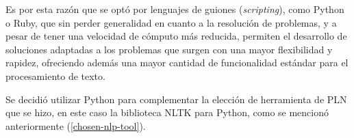 Es por esta razón que se optó por lenguajes de guiones (\textit{scripting}), como Python o Ruby, que sin perder generalidad en cuanto a la resolución de problemas, y a pesar de tener una velocidad de cómputo más reducida, permiten el desarrollo de soluciones adaptadas a los problemas que surgen con una mayor flexibilidad y rapidez, ofreciendo además una mayor cantidad de funcionalidad estándar para el procesamiento de texto.

Se decidió utilizar Python para complementar la elección de herramienta de PLN que se hizo, en este caso la biblioteca NLTK para Python, como se mencionó anteriormente (\ref{chosen-nlp-tool}).
